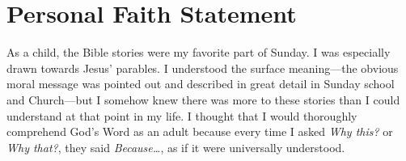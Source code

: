 \documentclass{article}%
\title{}
\author{Dr. Karen Tatum}
\begin{document}
\pagestyle{empty}
\section*{Personal Faith Statement}
As a child, the Bible stories were my favorite part of Sunday. %
I was especially drawn towards Jesus' parables. 
I understood the surface meaning---the obvious moral message was pointed out and described in great detail in Sunday school and Church---but I somehow knew there was more to these stories than I could understand at that point in my life. 
I thought that I would thoroughly comprehend God's Word as an adult because every time I asked \emph{Why this?} or \emph{Why that?}, they said \emph{Because\dots}, as if it were universally understood. %

 
\end{document}
